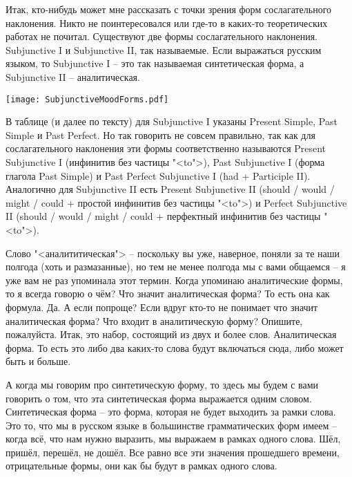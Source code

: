 \documentclass[main.tex]{subfiles}
\begin{document}
Итак, кто-нибудь может мне рассказать с точки зрения форм сослагательного наклонения.
Никто не поинтересовался или где-то в каких-то теоретических работах не почитал.
Существуют две формы сослагательного наклонения.
Subjunctive I и Subjunctive II, так называемые.
Если выражаться русским языком, то Subjunctive I -- это так называемая синтетическая форма, а Subjunctive II -- аналитическая.

{\parindent0pt\texttt{[image: SubjunctiveMoodForms.pdf]}}

 В таблице (и далее по тексту) для Subjunctive I указаны Present Simple, Past Simple и Past Perfect.
Но так говорить не совсем правильно, так как для сослагательного наклонения эти формы соответственно называются Present Subjunctive I (инфинитив без частицы "<to">), Past Subjunctive I (форма глагола Past Simple) и Past Perfect Subjunctive I (had + Participle II).\newline
Аналогично для Subjunctive II есть Present Subjunctive II (should / would / might / could + простой инфинитив без частицы "<to">) и Perfect Subjunctive II (should / would / might / could + перфектный инфинитив без частицы "<to">).

Слово "<аналититическая"> -- поскольку вы уже, наверное, поняли за те наши полгода (хоть и размазанные), но тем не менее полгода мы с вами общаемся -- я уже вам не раз упоминала этот термин.
Когда упоминаю аналитические формы, то я всегда говорю о чём?
Что значит аналитическая форма?
То есть она как формула.
Да.
А если попроще?
Если вдруг кто-то не понимает что значит аналитическая форма?
Что входит в аналитическую форму?
Опишите, пожалуйста.
Итак, это набор, состоящий из двух и более слов.
Аналитическая форма.
То есть это либо два каких-то слова будут включаться сюда, либо может быть и больше.

А когда мы говорим про синтетическую форму, то здесь мы будем с вами говорить о том, что эта синтетическая форма выражается одним словом.
Синтетическая форма -- это форма, которая не будет выходить за рамки слова.
Это то, что мы в русском языке в большинстве грамматических форм имеем -- когда всё, что нам нужно выразить, мы выражаем в рамках одного слова.
Шёл, пришёл, перешёл, не дошёл.
Все равно все эти значения прошедшего времени, отрицательные формы, они как бы будут в рамках одного слова.
\end{document}
